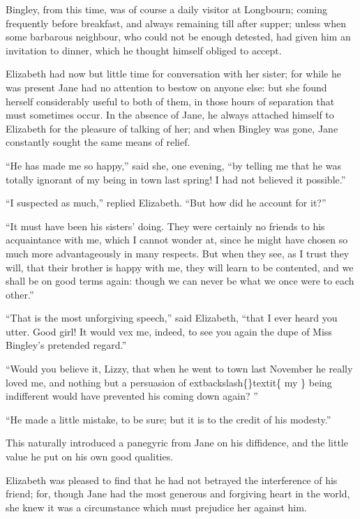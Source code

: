 \documentclass[10pt]{book}
\begin{document}
   Bingley, from this time, was of course a daily visitor at Longbourn;
coming frequently before breakfast, and always remaining till after
supper; unless when some
   barbarous neighbour, who could not be enough
detested, had given him an invitation to dinner, which he thought
himself obliged to accept.
  

   Elizabeth had now but little time for conversation with her sister; for
while he was present Jane had no attention to bestow on anyone else: but
she found herself considerably useful to both of them, in those hours of
separation that must sometimes occur. In the absence of Jane, he always
attached himself to Elizabeth for the pleasure of talking of her; and
when Bingley was gone, Jane constantly sought the same means of relief.
  

   “He has made me so happy,” said she, one evening, “by telling me that he
was totally ignorant of my being in town last spring! I had not believed
it possible.”
  

   “I suspected as much,” replied Elizabeth. “But how did he account for
it?”
  

   “It must have been his sisters’ doing. They were certainly no friends to
his acquaintance with me, which I cannot wonder at, since he might have
chosen so much more advantageously in many respects. But when they see,
as I trust they will, that their brother is happy with me, they will
learn to be contented, and we shall be on good terms again: though we
can never be what we once were to each other.”
  

   “That is the most unforgiving speech,” said Elizabeth, “that I ever
heard you utter. Good girl! It would vex me, indeed, to see you again
the dupe of Miss Bingley’s pretended regard.”
  

   “Would you believe it, Lizzy, that when he went to town last November he
really loved me, and nothing but a persuasion of
   	extbackslash\{\}textit\{
    my
   \}
   being indifferent
would have prevented his coming down again?
   ”
  

   “He made a little mistake, to be sure; but it is to the credit of his
modesty.”
  

   This naturally introduced a panegyric from Jane on his diffidence, and
the little value he put on his own good qualities.
  

   Elizabeth was pleased to find that he had not betrayed the interference
of his friend; for, though Jane had the most generous and forgiving
heart in the world, she knew it was a circumstance which must prejudice
her against him.
  
\end{document}
